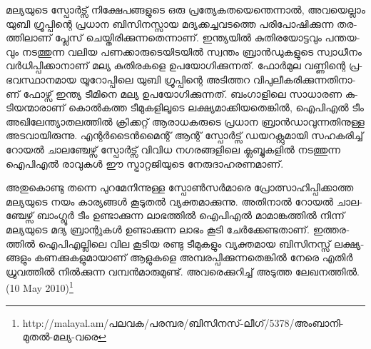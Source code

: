 
­മ­ല്യ­യു­ടെ സ്പോര്‍­ട്സ് നി­ക്ഷേ­പ­ങ്ങ­ളു­ടെ ഒരു പ്ര­ത്യേ­ക­ത­യെ­ന്തെ­ന്നാല്‍, അവ­യെ­ല്ലാം യു­ബി ഗ്രൂ­പ്പി­ന്റെ പ്ര­ധാന ബി­സി­ന­സ്സായ 
മദ്യ­ക്ക­ച്ച­വ­ട­ത്തെ പരി­പോ­ഷി­ക്കു­ന്ന തര­ത്തി­ലാ­ണ് പ്ലേ­സ് ചെ­യ്തി­രി­ക്കു­ന്ന­തെ­ന്നാ­ണ്. ഇന്ത്യ­യില്‍ കു­തി­ര­യോ­ട്ട­വും പന്ത­യ­വും 
നട­ത്തു­ന്ന വലിയ പണ­ക്കാ­രു­ടെ­യി­ട­യില്‍ സ്വ­ന്തം ബ്രാന്‍­ഡു­ക­ളു­ടെ സ്വാ­ധീ­നം വര്‍­ധി­പ്പി­ക്കാ­നാ­ണ് മല്യ കു­തി­ര­ക­ളെ 
ഉപ­യോ­ഗി­ക്കു­ന്ന­ത്. ഫോര്‍­മുല വണ്ണി­ന്റെ പ്ര­ഭ­വ­സ്ഥാ­ന­മായ യൂ­റോ­പ്പി­ലെ യു­ബി ഗ്രൂ­പ്പി­ന്റെ അടി­ത്തറ വി­പു­ലീ­ക­രി­ക്കു­ന്ന­തി­നാ­ണ് 
ഫോ­ഴ്സ് ഇന്ത്യ ടീ­മി­നെ മല്യ ഉപ­യോ­ഗി­ക്കു­ന്ന­ത്. ബം­ഗാ­ളി­ലെ സാ­ധാ­രണ കു­ടി­യ­ന്മാ­രാ­ണ് കൊല്‍­ക­ത്ത ടീ­മു­ക­ളി­ലൂ­ടെ 
ലക്ഷ്യ­മാ­ക്കി­യ­തെ­ങ്കില്‍, ഐപി­എല്‍ ടീം അഖി­ലേ­ന്ത്യാ­ത­ല­ത്തില്‍ ക്രി­ക്ക­റ്റ് ആരാ­ധ­ക­രു­ടെ പ്ര­ധാന ബ്രാന്‍­ഡാ­വു­ന്ന­തി­നു­ള്ള 
അട­വാ­യി­രു­ന്നു. എന്റര്‍­ടൈന്‍­മൈ­ന്റ് ആന്റ് സ്പോര്‍­ട്സ് ഡയ­റ­ക്റ്റു­മാ­യി സഹ­ക­രി­ച്ച് റോ­യല്‍ ചാ­ല­ഞ്ചേ­ഴ്സ് സ്പോര്‍­ട്സ് 
വി­വിധ നഗ­ര­ങ്ങ­ളി­ലെ ക്ല­ബ്ബു­ക­ളില്‍ നട­ത്തു­ന്ന ഐപി­എല്‍ രാ­വു­കള്‍ ഈ സ്ട്രാ­റ്റ­ജി­യു­ടെ നേ­രു­ദാ­ഹ­ര­ണ­മാ­ണ്.

അ­തു­കൊ­ണ്ടു തന്നെ പു­റ­മേ­നി­ന്നു­ള്ള സ്പോണ്‍­സര്‍­മാ­രെ പ്രോ­ത്സാ­ഹി­പ്പി­ക്കാ­ത്ത മല്യ­യു­ടെ നയം കാ­ര്യ­ങ്ങള്‍ കൂ­ടു­തല്‍ 
വ്യ­ക്ത­മാ­ക്കു­ന്നു. അതി­നാല്‍ റോ­യല്‍ ചാ­ല­ഞ്ചേ­ഴ്സ് ബാം­ഗ്ലൂര്‍ ടീം ഉണ്ടാ­ക്കു­ന്ന ലാ­ഭ­ത്തില്‍ ഐപി­എല്‍ മാ­മാ­ങ്ക­ത്തില്‍ 
നി­ന്ന് മല്യ­യു­ടെ മദ്യ ബ്രാ­ന്റു­കള്‍ ഉണ്ടാ­ക്കു­ന്ന ലാ­ഭം കൂ­ടി ചേര്‍­ക്കേ­ണ്ട­താ­ണ്. ഇത്ത­ര­ത്തില്‍ ഐപി­എ­ല്ലി­ലെ വില കൂ­ടിയ 
രണ്ടു ടീ­മു­ക­ളും വ്യ­ക്ത­മായ ബി­സി­ന­സ്സ് ലക്ഷ്യ­ങ്ങ­ളും കണ­ക്കു­ക­ളു­മാ­യാ­ണ് ആളു­ക­ളെ അമ്പ­ര­പ്പി­ക്കു­ന്ന­തെ­ങ്കില്‍ നേ­രെ 
എതിര്‍ ധ്രു­വ­ത്തില്‍ നില്‍­ക്കു­ന്ന വമ്പന്‍­മാ­രു­മു­ണ്ട്. അവ­രെ­ക്കു­റി­ച്ച് അടുത്ത ലേ­ഖ­ന­ത്തില്‍.
(10 May 2010)\footnote{http://malayal.am/പലവക/പരമ്പര/ബിസിനസ്-ലീഗ്/5378/അംബാനി-മുതല്‍-മല്യ-വരെ}

\newpage
